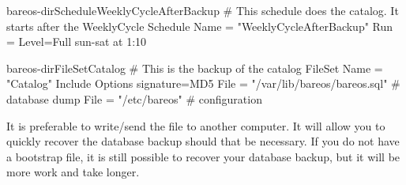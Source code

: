 \begin{bareosConfigResource}{bareos-dir}{Schedule}{WeeklyCycleAfterBackup}
# This schedule does the catalog. It starts after the WeeklyCycle
Schedule {
  Name = "WeeklyCycleAfterBackup"
  Run = Level=Full sun-sat at 1:10
}
\end{bareosConfigResource}

\begin{bareosConfigResource}{bareos-dir}{FileSet}{Catalog}
# This is the backup of the catalog
FileSet {
  Name = "Catalog"
  Include {
    Options {
      signature=MD5
    }
    File = "/var/lib/bareos/bareos.sql" # database dump
    File = "/etc/bareos"                # configuration
  }
}
\end{bareosConfigResource}

It is preferable
to write/send the  file to another computer. It will allow
you to quickly recover the database backup should that be necessary.  If
you do not have a bootstrap file, it is still possible to recover your
database backup, but it will be more work and take longer.
